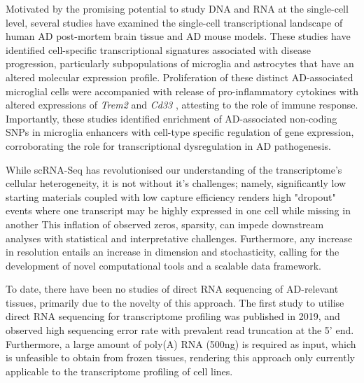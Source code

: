 Motivated by the promising potential to study DNA and RNA at the single-cell level, several studies have examined the single-cell transcriptional landscape of human AD post-mortem brain tissue\cite{Mathys2019,Nott2019,Thrupp2020,Olah2020,Leng2021,Young2021} and AD mouse models\cite{Keren-Shaul2017,Mathys2017}. These studies have identified cell-specific transcriptional signatures associated with disease progression, particularly subpopulations of microglia and astrocytes that have an altered molecular expression profile. Proliferation of these distinct AD-associated microglial cells were accompanied with release of pro-inflammatory cytokines\cite{Mathys2017} with altered expressions of \textit{Trem2} and \textit{Cd33} \cite{Mathys2019,Frigerio2019}, attesting to the role of immune response. Importantly, these studies identified enrichment of AD-associated non-coding SNPs in microglia enhancers with cell-type specific regulation of gene expression\cite{Tansey2018,Nott2019,Young2021,Novikova2021}, corroborating the role for transcriptional dysregulation in AD pathogenesis.   

While scRNA-Seq has revolutionised our understanding of the transcriptome's cellular heterogeneity, it is not without it's challenges; namely, significantly low starting materials coupled with low capture efficiency renders high "dropout" events where one transcript may be highly expressed in one cell while missing in another\cite{Lahnemann2020,Adil2021} This inflation of observed zeros, sparsity, can impede downstream analyses with statistical and interpretative challenges\cite{Adil2021}. Furthermore, any increase in resolution entails an increase in dimension and stochasticity, calling for the development of novel computational tools and a scalable data framework\cite{Lahnemann2020}. 

\newpage
{}
To date, there have been no studies of direct RNA sequencing of AD-relevant tissues, primarily due to the novelty of this approach. The first study to utilise direct RNA sequencing for transcriptome profiling was published in 2019, and observed high sequencing error rate with prevalent read truncation at the 5' end\cite{Workman2019a}. Furthermore, a large amount of poly(A) RNA (500ng) is required as input, which is unfeasible to obtain from frozen tissues, rendering this approach only currently applicable to the transcriptome profiling of cell lines.      
  

